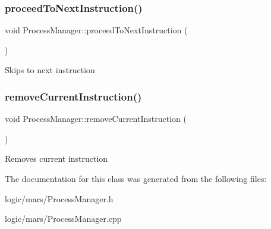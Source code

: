 \subsubsection{\texorpdfstring{proceed\+To\+Next\+Instruction()}{proceedToNextInstruction()}}
{\footnotesize\ttfamily void Process\+Manager\+::proceed\+To\+Next\+Instruction (\begin{DoxyParamCaption}{ }\end{DoxyParamCaption})}

Skips to next instruction \mbox{\label{classProcessManager_a7e9a444c31df1147142843da620ffecd}} 
\subsubsection{\texorpdfstring{remove\+Current\+Instruction()}{removeCurrentInstruction()}}
{\footnotesize\ttfamily void Process\+Manager\+::remove\+Current\+Instruction (\begin{DoxyParamCaption}{ }\end{DoxyParamCaption})}

Removes current instruction 

The documentation for this class was generated from the following files\+:\begin{DoxyCompactItemize}
\item 
logic/mars/Process\+Manager.\+h\item 
logic/mars/Process\+Manager.\+cpp\end{DoxyCompactItemize}
